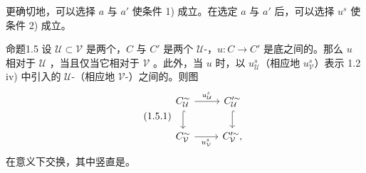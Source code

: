更确切地，可以选择 $a$ 与 $a'$ 使条件 1) 成立。在选定 $a$ 与 $a'$ 后，可以选择 $u^s$ 使条件 2) 成立。

\begin{SGAresult}{命题}{1.5}
设 $\mathcal U\subset\mathcal V$ 是两个，$C$ 与 $C'$ 是两个 $\mathcal U$-，$u:C\to C'$ 是底之间的。那么 $u$ 相对于 $\mathcal U$ ，当且仅当它相对于 $\mathcal V$ 。此外，当 $u$ 时，以 $u^s_{\mathcal U}$（相应地 $u^s_{\mathcal V}$）表示 1.2 iv) 中引入的 $\mathcal U$-（相应地 $\mathcal V$-）之间的。则图
\begin{equation}\tag{1.5.1}
\begin{tikzcd}
 C^{\sim}_{\mathcal U}\arrow[r,"u^s_{\mathcal U}"]\arrow[d,hook]&C'^{\sim}_{\mathcal U}\arrow[d,hook]\\
 C^{\sim}_{\mathcal V}\arrow[r,"u^s_{\mathcal V}"']&C'^{\sim}_{\mathcal V},
\end{tikzcd}
\end{equation}
在意义下交换，其中竖直是。
\end{SGAresult}
